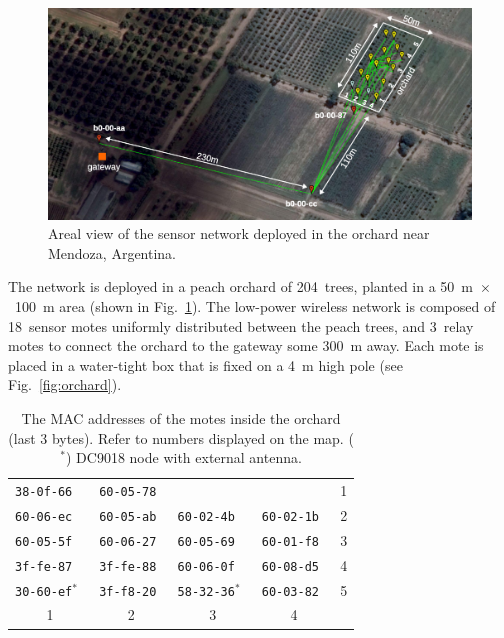 \documentclass{sig-alternate}
\begin{document}
\begin{figure}
    \centering
    \includegraphics[width=\textwidth]{map_annotated}
    \caption{Areal view of the sensor network deployed in the orchard near Mendoza, Argentina.}
    \label{fig:map}
\end{figure}


The network is deployed in a peach orchard of 204~trees, planted in a 50~m~$\times$~100~m area (shown in Fig.~\ref{fig:map}).
The low-power wireless network is composed of 18~sensor motes uniformly distributed between the peach trees, and 3~relay motes to connect the orchard to the gateway some 300~m away.
Each mote is placed in a water-tight box that is fixed on a 4~m high pole (see Fig.~\ref{fig:orchard}).

\begin{table}
\begin{center}
    \begin{tabular}{ | l | l | l | l | l |}
         \hline
         \tt{38-0f-66}     & \tt{60-05-78} &                   &               & 1 \\
         \tt{60-06-ec}     & \tt{60-05-ab} & \tt{60-02-4b}     & \tt{60-02-1b} & 2 \\
         \tt{60-05-5f}     & \tt{60-06-27} & \tt{60-05-69}     & \tt{60-01-f8} & 3 \\
         \tt{3f-fe-87}     & \tt{3f-fe-88} & \tt{60-06-0f}     & \tt{60-08-d5} & 4 \\
         \tt{30-60-ef}$^*$ & \tt{3f-f8-20} & \tt{58-32-36}$^*$ & \tt{60-03-82} & 5 \\
         \hline
           \multicolumn{1}{|c|}{1} & \multicolumn{1}{|c|}{2} & \multicolumn{1}{|c|}{3} & \multicolumn{1}{|c|}{4} &\\
         \hline
    \end{tabular}
    \caption{The MAC addresses of the motes inside the orchard (last 3 bytes). Refer to numbers displayed on the map. ($^*$) DC9018 node with external antenna.}
\end{center}
\end{table}
\end{document}
